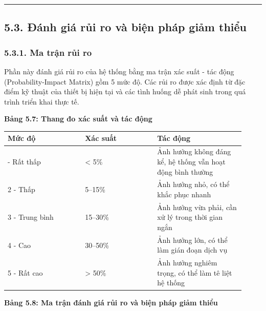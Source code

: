 \documentclass[13pt,a4paper]{extarticle}
\newcounter{none} %
\newcommand{\thesislongtableorignewline}{}
\let\thesislongtableorignewline\\
\renewcommand{\\}{\thesislongtableorignewline\hline}%
\let\\\thesislongtableorignewline
\newcommand{\thesistabletitle}[1]{%
  \begin{center}\textbf{#1}\end{center}%
}
\begin{document}
\begin{center}\rule{0.5\linewidth}{0.5pt}\end{center}

\subsection{5.3. Đánh giá rủi ro và biện pháp giảm
thiểu}\label{53-ux111uxe1nh-giuxe1-rux1ee7i-ro-vuxe0-biux1ec7n-phuxe1p-giux1ea3m-thiux1ec3u}

\subsubsection{5.3.1. Ma trận rủi
ro}\label{531-ma-trux1eadn-rux1ee7i-ro}

Phần này đánh giá rủi ro của hệ thống bằng ma trận xác suất - tác động
(Probability-Impact Matrix) gồm 5 mức độ. Các rủi ro được xác định từ
đặc điểm kỹ thuật của thiết bị hiện tại và các tình huống dễ phát sinh
trong quá trình triển khai thực tế.

\thesistabletitle{Bảng 5.7: Thang đo xác suất và tác động}

{\def\LTcaptype{none} %
\begin{longtable}{|p{0.30\linewidth}|p{0.28\linewidth}|p{0.34\linewidth}|}
\hline \textbf{Mức độ} & \textbf{Xác suất} & \textbf{Tác động} \\
\hline
\endhead
\hline
\endlastfoot
1 - Rất thấp & \textless{} 5\% & Ảnh hưởng không đáng kể, hệ thống vẫn
hoạt động bình thường \\
2 - Thấp & 5--15\% & Ảnh hưởng nhỏ, có thể khắc phục nhanh \\
3 - Trung bình & 15--30\% & Ảnh hưởng vừa phải, cần xử lý trong thời
gian ngắn \\
4 - Cao & 30--50\% & Ảnh hưởng lớn, có thể làm gián đoạn dịch vụ \\
5 - Rất cao & \textgreater{} 50\% & Ảnh hưởng nghiêm trọng, có thể làm
tê liệt hệ thống \\
\end{longtable}
}

\thesistabletitle{Bảng 5.8: Ma trận đánh giá rủi ro và biện pháp giảm thiểu}
\end{document}

